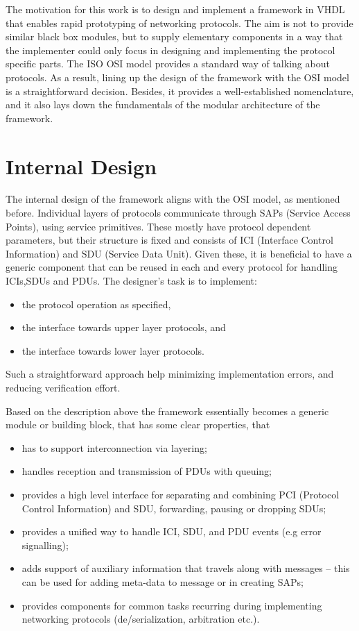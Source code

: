 \documentclass[conference]{IEEEtran}
\begin{document}
The motivation for this work is to design and implement a framework in VHDL that enables rapid prototyping of
networking protocols. The aim is not to provide similar black box modules, but to supply elementary components in a way
that the implementer could only focus in designing and implementing the protocol specific parts. The ISO OSI model
provides a standard way of talking about protocols. As a result, lining up the design of the framework with the OSI
model is a straightforward decision. Besides, it provides a well-established nomenclature, and it also lays down the
fundamentals of the modular architecture of the framework.

\section{Internal Design}\label{sec:Internal Design}

The internal design of the framework aligns with the OSI model, as mentioned before. Individual layers of protocols
communicate through SAPs (Service Access Points), using service primitives.
These mostly have protocol dependent parameters, but their structure is fixed and consists of ICI (Interface Control
Information) and SDU (Service Data Unit). Given these, it is beneficial to have a generic component that can be reused
in each and every protocol for handling ICIs,SDUs and PDUs. The designer's task is to implement:
\begin{itemize}
    \renewcommand \labelitemi{--}
    \item the protocol operation as specified,
    \item the interface towards upper layer protocols, and
    \item the interface towards lower layer protocols.
\end{itemize}

Such a straightforward approach help minimizing implementation errors, and reducing verification effort.

Based on the description above the framework essentially becomes a generic module or building block, that has some
clear properties, that

\begin{itemize}
    \renewcommand \labelitemi{--}
    \item has to support interconnection via layering;
    \item handles reception and transmission of PDUs with queuing;
    \item provides a high level interface for separating and combining PCI (Protocol Control Information) and SDU,
          forwarding, pausing or dropping SDUs;
    \item provides a unified way to handle ICI, SDU, and PDU events (e.g error signalling);
    \item adds support of auxiliary information that travels along with messages -- this can be used for adding
          meta-data to message or in creating SAPs;
    \item provides components for common tasks recurring during implementing networking protocols
          (de/serialization, arbitration etc.).
\end{itemize}
\end{document}
